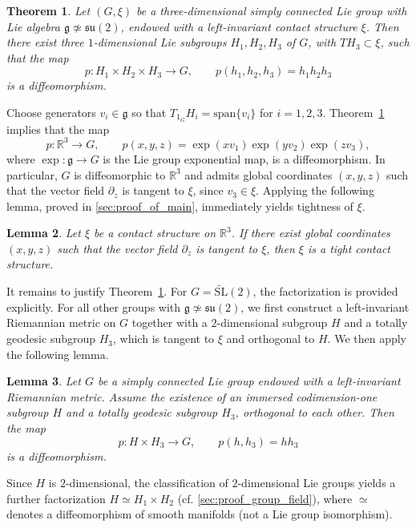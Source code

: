 \documentclass[reqno]{amsart}
\newtheorem{theorem}{Theorem}[section]
\newtheorem{lemma}[theorem]{Lemma}
\theoremstyle{remark}
\theoremstyle{plain}
\begin{document}
\begin{theorem}\label{thm:group_v_field_intro}
	Let \((G,\xi)\) be a three-dimensional simply connected Lie group with Lie algebra \(\mathfrak g \not\simeq \mathfrak{su}(2)\), endowed with a left-invariant contact structure $\xi$. Then there exist three \(1\)-dimensional Lie subgroups \(H_1,H_2,H_3\) of $G$, with \(T H_3 \subset \xi\), such that the map
	\[
	p: H_1 \times H_2 \times H_3 \longrightarrow G, \qquad p(h_1,h_2,h_3)=h_1 h_2 h_3
	\]
	is a diffeomorphism.
\end{theorem}
\noindent
Choose generators \(v_i \in \mathfrak{g}\) so that \(T_{1_G}H_i = \mathrm{span}\{v_i\}\) for \(i=1,2,3\). Theorem~\ref{thm:group_v_field_intro} implies that the map
\[
p:\mathbb{R}^3 \longrightarrow G,\qquad 
p(x,y,z)=\exp(xv_1)\exp(yv_2)\exp(zv_3),
\]
where $\exp:\mathfrak g\to G$ is the Lie group exponential map, is a diffeomorphism. In particular, \(G\) is diffeomorphic to \(\mathbb{R}^3\) and admits global coordinates \((x,y,z)\) such that the vector field \(\partial_z\) is tangent to $\xi$, since $v_3\in \xi$.
Applying the following lemma, proved in \cref{sec:proof_of_main}, immediately yields tightness of \(\xi\).

\begin{lemma}
	Let \(\xi\) be a contact structure on \(\mathbb{R}^3\). If there exist global coordinates \((x,y,z)\) such that the vector field \(\partial_z\) is tangent to $\xi$, then \(\xi\) is a tight contact structure.
\end{lemma}

It remains to justify Theorem~\ref{thm:group_v_field_intro}.  
For $G = \widetilde{\mathrm{SL}}(2)$, the factorization is provided explicitly.  
For all other groups with \(\mathfrak g \not\simeq \mathfrak{su}(2)\), we first construct a left-invariant Riemannian metric on $G$ together with a $2$-dimensional subgroup $H$ and a totally geodesic subgroup $H_3$, which is tangent to $\xi$ and orthogonal to $H$.  
We then apply the following lemma.

\begin{lemma}\label{lem:orthogonal_is_product}
	Let $G$ be a simply connected Lie group endowed with a left-invariant Riemannian metric. Assume the existence of an immersed codimension-one subgroup $H$ and a totally geodesic subgroup $H_3$, orthogonal to each other. Then the map
	\[
	p:H \times H_3 \longrightarrow G, \qquad p(h,h_3)=hh_3
	\]
	is a diffeomorphism.
\end{lemma}
\noindent 
Since $H$ is $2$-dimensional, the classification of $2$-dimensional Lie groups yields a further factorization \(H \simeq H_1 \times H_2 \) (cf. \cref{sec:proof_group_field}), where $\simeq$ denotes a diffeomorphism of smooth manifolds (not a Lie group isomorphism).
\end{document}
